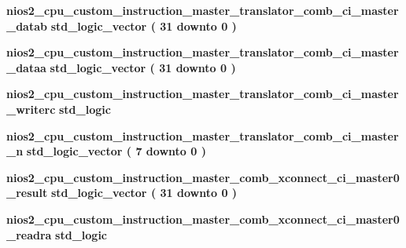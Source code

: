 \begin{DoxyCompactItemize}
\item 
{\bf nios2\+\_\+cpu\+\_\+custom\+\_\+instruction\+\_\+master\+\_\+translator\+\_\+comb\+\_\+ci\+\_\+master\+\_\+datab} {\bfseries \textcolor{comment}{std\+\_\+logic\+\_\+vector}\textcolor{vhdlchar}{ }\textcolor{vhdlchar}{(}\textcolor{vhdlchar}{ }\textcolor{vhdlchar}{ } \textcolor{vhdldigit}{31} \textcolor{vhdlchar}{ }\textcolor{keywordflow}{downto}\textcolor{vhdlchar}{ }\textcolor{vhdlchar}{ } \textcolor{vhdldigit}{0} \textcolor{vhdlchar}{ }\textcolor{vhdlchar}{)}\textcolor{vhdlchar}{ }} 
\item 
{\bf nios2\+\_\+cpu\+\_\+custom\+\_\+instruction\+\_\+master\+\_\+translator\+\_\+comb\+\_\+ci\+\_\+master\+\_\+dataa} {\bfseries \textcolor{comment}{std\+\_\+logic\+\_\+vector}\textcolor{vhdlchar}{ }\textcolor{vhdlchar}{(}\textcolor{vhdlchar}{ }\textcolor{vhdlchar}{ } \textcolor{vhdldigit}{31} \textcolor{vhdlchar}{ }\textcolor{keywordflow}{downto}\textcolor{vhdlchar}{ }\textcolor{vhdlchar}{ } \textcolor{vhdldigit}{0} \textcolor{vhdlchar}{ }\textcolor{vhdlchar}{)}\textcolor{vhdlchar}{ }} 
\item 
{\bf nios2\+\_\+cpu\+\_\+custom\+\_\+instruction\+\_\+master\+\_\+translator\+\_\+comb\+\_\+ci\+\_\+master\+\_\+writerc} {\bfseries \textcolor{comment}{std\+\_\+logic}\textcolor{vhdlchar}{ }} 
\item 
{\bf nios2\+\_\+cpu\+\_\+custom\+\_\+instruction\+\_\+master\+\_\+translator\+\_\+comb\+\_\+ci\+\_\+master\+\_\+n} {\bfseries \textcolor{comment}{std\+\_\+logic\+\_\+vector}\textcolor{vhdlchar}{ }\textcolor{vhdlchar}{(}\textcolor{vhdlchar}{ }\textcolor{vhdlchar}{ } \textcolor{vhdldigit}{7} \textcolor{vhdlchar}{ }\textcolor{keywordflow}{downto}\textcolor{vhdlchar}{ }\textcolor{vhdlchar}{ } \textcolor{vhdldigit}{0} \textcolor{vhdlchar}{ }\textcolor{vhdlchar}{)}\textcolor{vhdlchar}{ }} 
\item 
{\bf nios2\+\_\+cpu\+\_\+custom\+\_\+instruction\+\_\+master\+\_\+comb\+\_\+xconnect\+\_\+ci\+\_\+master0\+\_\+result} {\bfseries \textcolor{comment}{std\+\_\+logic\+\_\+vector}\textcolor{vhdlchar}{ }\textcolor{vhdlchar}{(}\textcolor{vhdlchar}{ }\textcolor{vhdlchar}{ } \textcolor{vhdldigit}{31} \textcolor{vhdlchar}{ }\textcolor{keywordflow}{downto}\textcolor{vhdlchar}{ }\textcolor{vhdlchar}{ } \textcolor{vhdldigit}{0} \textcolor{vhdlchar}{ }\textcolor{vhdlchar}{)}\textcolor{vhdlchar}{ }} 
\item 
{\bf nios2\+\_\+cpu\+\_\+custom\+\_\+instruction\+\_\+master\+\_\+comb\+\_\+xconnect\+\_\+ci\+\_\+master0\+\_\+readra} {\bfseries \textcolor{comment}{std\+\_\+logic}\textcolor{vhdlchar}{ }} 

\end{DoxyCompactItemize}
